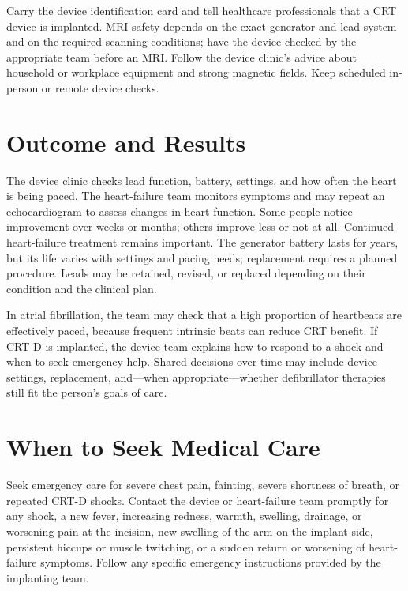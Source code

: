 Carry the device identification card and tell healthcare professionals that a CRT device is implanted. MRI safety depends on the exact generator and lead system and on the required scanning conditions; have the device checked by the appropriate team before an MRI. Follow the device clinic's advice about household or workplace equipment and strong magnetic fields. Keep scheduled in-person or remote device checks.

\section*{Outcome and Results}
The device clinic checks lead function, battery, settings, and how often the heart is being paced. The heart-failure team monitors symptoms and may repeat an echocardiogram to assess changes in heart function. Some people notice improvement over weeks or months; others improve less or not at all. Continued heart-failure treatment remains important. The generator battery lasts for years, but its life varies with settings and pacing needs; replacement requires a planned procedure. Leads may be retained, revised, or replaced depending on their condition and the clinical plan.

In atrial fibrillation, the team may check that a high proportion of heartbeats are effectively paced, because frequent intrinsic beats can reduce CRT benefit. If CRT-D is implanted, the device team explains how to respond to a shock and when to seek emergency help. Shared decisions over time may include device settings, replacement, and—when appropriate—whether defibrillator therapies still fit the person's goals of care.

\section*{When to Seek Medical Care}
Seek emergency care for severe chest pain, fainting, severe shortness of breath, or repeated CRT-D shocks. Contact the device or heart-failure team promptly for any shock, a new fever, increasing redness, warmth, swelling, drainage, or worsening pain at the incision, new swelling of the arm on the implant side, persistent hiccups or muscle twitching, or a sudden return or worsening of heart-failure symptoms. Follow any specific emergency instructions provided by the implanting team.

